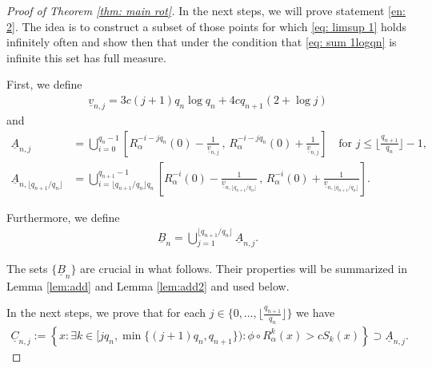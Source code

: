\documentclass[11pt]{amsart}
\theoremstyle{definition}
\numberwithin{equation}{section}
\begin{document}
\begin{proof}[Proof of Theorem \ref{thm: main rot}]
In the next steps, we will prove statement \eqref{en: 2}.
The idea is to construct a subset of those points for which \eqref{eq: limsup 1} holds infinitely often and show then that under the condition that \eqref{eq: sum 1logqn} is infinite this set has full measure. 

First, we define 
\begin{align}\label{vnj}
 \underline{v}_{n,j}= 3c(j+1) q_n\log q_n +  4cq_{n+1}(2+ \log j)
\end{align}
and 
 \begin{align*}
  \underline{A}_{n,j}
  &=\bigcup_{i=0}^{q_{n}-1} 
  \left[ R_{\alpha}^{-i-jq_n}(0)-\frac{1}{\underline{v}_{n,j}}\, ,\, R_{\alpha}^{-i-jq_n}(0) + \frac{1}{\underline{v}_{n,j}}\right]\quad \text{for }j\leq \Big\lfloor \frac{q_{n+1}}{q_n}\Big\rfloor -1,\\
  \underline{A}_{n,\lfloor q_{n+1}/q_n\rfloor}
  &=\bigcup_{i=\lfloor q_{n+1}/q_n\rfloor q_n}^{q_{n+1}-1} 
  \left[ R_{\alpha}^{-i}(0)-\frac{1}{\underline{v}_{n,\lfloor q_{n+1}/q_n\rfloor}}\, ,\, R_{\alpha}^{-i}(0) + \frac{1}{\underline{v}_{n,\lfloor q_{n+1}/q_n\rfloor}}\right].
\end{align*}

Furthermore, we define
\begin{align*}
 \underline{B}_n=\bigcup_{j=1}^{\lfloor q_{n+1}/q_n\rfloor}\underline{A}_{n,j}.
\end{align*}

The sets  $\{\underline{B}_n\}$ are crucial in what follows. Their properties will be summarized in Lemma \ref{lem:add} and Lemma \ref{lem:add2} and used below.


In the next steps, we prove that for each $j\in\{0,\ldots, \lfloor \frac{q_{n+1}}{q_n}\rfloor \}$ we have 
 \begin{align}
  \underline{C}_{n,j}:=\left\{x: \exists k\in  [j q_n,\min \{(j+1)q_n, q_{n+1}\}): \phi\circ R_{\alpha}^k(x)> c S_{k}(x) \right\} \supset \underline{A}_{n,j}.\label{eq: Cnj supset Anj}
 \end{align}



\end{proof}
\end{document}
